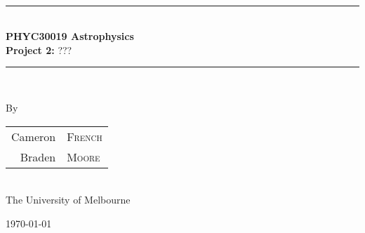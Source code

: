 \documentclass[a4paper]{article} %
\begin{document}
\pagestyle{empty}

\newcommand{\HRule}{\rule{\linewidth}{0.5mm}}

\begin{titlepage}

    \begin{center}
        \textsc{}\\[3cm]

        \HRule \\[0.5cm]
        \Huge \textbf{PHYC30019 Astrophysics}\\[0.5cm]
        \huge \textbf{Project 2:} ???\\[0.5cm] 
        \HRule \\[1.5cm]

        \begin{minipage}{0.5\textwidth}
        \begin{center}

		\vspace{3cm}
        \large By \\[0.75cm]
        \begin{tabular}{rl}
        \Large Cameron & \Large \textsc{French} \\ [0.1cm]
        \Large Braden &\Large \textsc{Moore} \\
		\end{tabular}  
		\\[1cm]
        \normalsize \normalfont 
        The University of Melbourne \\[2cm]

        \end{center}
        \end{minipage}

        \vfill

        \large \today
    \end{center}

\newpage
\end{titlepage}
\begin{comment}
\pagestyle{fancy}
\pagenumbering{gobble}
\tableofcontents
\newpage
\end{comment}

\pagestyle{fancy}
\setcounter{page}{1}
\end{document}
